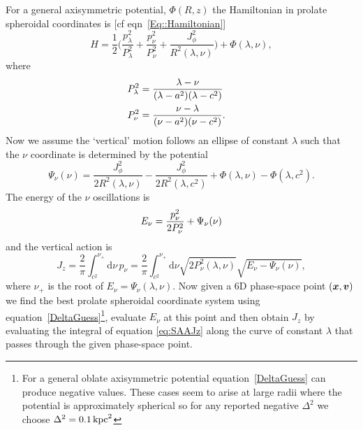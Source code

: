 \documentclass[useAMS,usenatbib,fleqn,a4paper]{mn2e}
\def\kpc{\,{\rm kpc}}
\def\half{{\textstyle{\frac12}}}
\newcommand{\bs}[1]{\bmath{#1}}
\begin{document}
For a general axisymmetric potential, $\Phi(R,z)$ the Hamiltonian in prolate
spheroidal coordinates is [cf eqn~\ref{Eq::Hamiltonian}]
\begin{equation}
H = \half\Big(\frac{p_\lambda^2}{P_\lambda^2}+\frac{p_\nu^2}{P_\nu^2}
+\frac{J_\phi^2}{R^2(\lambda,\nu)}\Big)+\Phi(\lambda,\nu),
\end{equation}
where
\begin{equation}
\begin{split}
P_\lambda^2 &=\frac{\lambda-\nu}{(\lambda-a^2)(\lambda-c^2)}\cr
P_\nu^2 &=\frac{\nu-\lambda}{(\nu-a^2)(\nu-c^2)}.
\end{split}
\end{equation}
Now we assume the `vertical' motion follows an ellipse of constant
$\lambda$ such that the $\nu$ coordinate is determined by the
potential
\begin{equation}
\Psi_\nu(\nu) = \frac{J_\phi^2}{2R^2(\lambda,\nu)}
-\frac{J_\phi^2}{2R^2(\lambda,c^2)}+\Phi(\lambda,\nu)-\Phi(\lambda,c^2).
\end{equation}
The energy of the $\nu$ oscillations is
\begin{equation}
E_\nu = {p_\nu^2\over2P_\nu^2} + \Psi_\nu(\nu)
\end{equation}
and the vertical action is
\begin{equation}\label{eq:SAAJz}
J_z = \frac{2}{\pi}\int_{c^2}^{\nu_+}\mathrm{d}\nu\,p_\nu
= \frac{2}{\pi}\int_{c^2}^{\nu_+}\mathrm{d}\nu\sqrt{2P_\nu^2(\lambda,\nu)}\sqrt{E_\nu-\Psi_\nu(\nu)},
\end{equation}
where $\nu_+$ is the root of $E_\nu=\Psi_\nu(\lambda,\nu)$.  Now given a 6D
phase-space point $(\bs{x},\bs{v})$ we  find the best prolate spheroidal
coordinate system using equation~\eqref{DeltaGuess}\footnote{For a general
oblate axisymmetric potential equation~\eqref{DeltaGuess} can produce
negative values. These cases seem to arise at large radii where the potential
is approximately spherical so for any reported negative $\Delta^2$ we choose
$\Delta^2 = 0.1\kpc^2$}, evaluate $E_\nu$ at this point and then obtain $J_z$
by evaluating the integral of equation \eqref{eq:SAAJz} along the curve of constant
$\lambda$ that passes through the given phase-space point.
\end{document}
